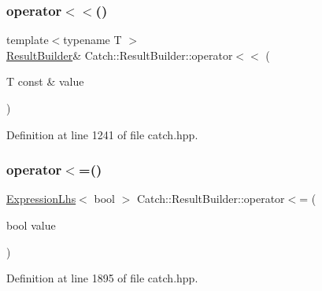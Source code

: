 \hypertarget{class_catch_1_1_result_builder_a5aa79ce6160ab8cd800eb65bbd7a28a4}{}\label{class_catch_1_1_result_builder_a5aa79ce6160ab8cd800eb65bbd7a28a4} 
\subsubsection{\texorpdfstring{operator$<$$<$()}{operator<<()}}
{\footnotesize\ttfamily template$<$typename T $>$ \\
\hyperlink{class_catch_1_1_result_builder}{Result\+Builder}\& Catch\+::\+Result\+Builder\+::operator$<$$<$ (\begin{DoxyParamCaption}\item[{T const \&}]{value }\end{DoxyParamCaption})\hspace{0.3cm}{\ttfamily [inline]}}



Definition at line 1241 of file catch.\+hpp.

\hypertarget{class_catch_1_1_result_builder_a3b87b20bcd1ef9e630880e59eeefba2a}{}\label{class_catch_1_1_result_builder_a3b87b20bcd1ef9e630880e59eeefba2a} 
\subsubsection{\texorpdfstring{operator$<$=()}{operator<=()}\hspace{0.1cm}{\footnotesize\ttfamily [1/2]}}
{\footnotesize\ttfamily \hyperlink{class_catch_1_1_expression_lhs}{Expression\+Lhs}$<$ bool $>$ Catch\+::\+Result\+Builder\+::operator$<$= (\begin{DoxyParamCaption}\item[{bool}]{value }\end{DoxyParamCaption})\hspace{0.3cm}{\ttfamily [inline]}}



Definition at line 1895 of file catch.\+hpp.

\hypertarget{class_catch_1_1_result_builder_ad76939f5a52fcb534f97b49a0b7bc560}{}\label{class_catch_1_1_result_builder_ad76939f5a52fcb534f97b49a0b7bc560} 

